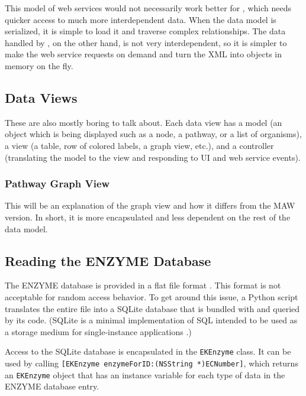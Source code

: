 This model of web services would not necessarily work better for \mawapp,
which needs quicker access to much more interdependent data. When the data model
is serialized, it is simple to load it and traverse complex relationships. The
data handled by \keggapp, on the other hand, is not very interdependent, so
it is simpler to make the web service requests on demand and turn the XML into
objects in memory on the fly.

\subsection{Data Views}
\label{sect:kegg_impl_data_views}

These are also mostly boring to talk about. Each data view has a model (an
object which is being displayed such as a node, a pathway, or a list of
organisms), a view (a table, row of colored labels, a graph view, etc.), and a
controller (translating the model to the view and responding to UI and web
service events).

\subsubsection{Pathway Graph View}
\label{sect:kegg_impl_graph_view}

This will be an explanation of the \keggapp graph view and how it differs from
the MAW version. In short, it is more encapsulated and less dependent on the
rest of the data model.

\subsection{Reading the ENZYME Database}
\label{sect:kegg_impl_enzyme}

The ENZYME database is provided in a flat file format \cite{enzyme:enzuser}. This
format is not acceptable for random access behavior. To get around this issue, a
Python script translates the entire file into a SQLite database that is bundled
with \keggapp and queried by its code. (SQLite is a minimal implementation
of SQL intended to be used as a storage medium for single-instance applications
\cite{sqlite:main}.)

Access to the SQLite database is encapsulated in the \texttt{EKEnzyme} class. It
can be used by calling \texttt{[EKEnzyme enzymeForID:(NSString *)ECNumber]},
which returns an \texttt{EKEnzyme} object that has an instance variable for each
type of data in the ENZYME database entry.

